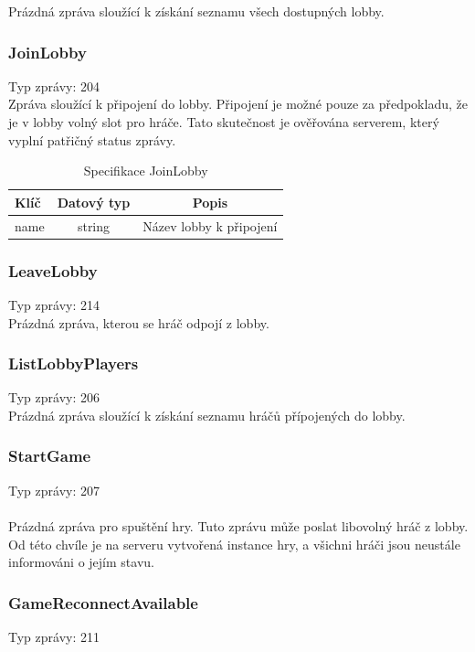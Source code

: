 \documentclass[12pt, a4paper]{article}
\begin{document}
    Prázdná zpráva sloužící k získání seznamu všech dostupných lobby.

    \subsubsection*{JoinLobby}
    Typ zprávy: 204\\

    Zpráva sloužící k připojení do lobby.
    Připojení je možné pouze za předpokladu, že je v lobby volný slot pro hráče.
    Tato skutečnost je ověřována serverem, který vyplní patřičný status zprávy.

    \begin{table}[H]
        \centering
        \begin{tabular}{|l|c|c|}
            \hline
            Klíč & Datový typ & Popis\\
            \hline
            \hline
            name & string & Název lobby k připojení\\
            \hline
        \end{tabular}
        \caption{Specifikace JoinLobby}
    \end{table} 

    \subsubsection*{LeaveLobby}
    Typ zprávy: 214\\

    Prázdná zpráva, kterou se hráč odpojí z lobby.

    \subsubsection*{ListLobbyPlayers}
    Typ zprávy: 206\\

    Prázdná zpráva sloužící k získání seznamu hráčů přípojených do lobby.

    \subsubsection*{StartGame}
    Typ zprávy: 207\\\\
    Prázdná zpráva pro spuštění hry.
    Tuto zprávu může poslat libovolný hráč z lobby.
    Od této chvíle je na serveru vytvořená instance hry, a všichni hráči jsou neustále informováni o jejím stavu.

    \subsubsection*{GameReconnectAvailable}
    Typ zprávy: 211\\
\end{document}
